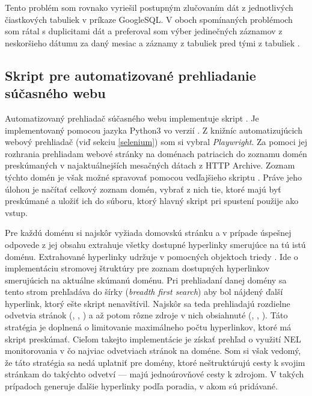 Tento problém som rovnako vyriešil postupným zlučovaním dát z jednotlivých čiastkových tabuliek v príkaze GoogleSQL.
V oboch spomínaných problémoch som rátal s duplicitami dát a preferoval som výber jedinečných záznamov z neskoršieho dátumu za daný mesiac a záznamy z tabuliek  pred tými z tabuliek .


\subsection{Skript pre automatizované prehliadanie súčasného webu}
\label{crawl_and_store}

Automatizovaný prehliadač súčasného webu implementuje skript .
Je implementovaný pomocou jazyka Python3 vo verzií . Z knižníc automatizujúcich webový 
prehliadač (viď sekciu \ref{selenium}) som si vybral \textit{Playwright}. 
Za pomoci jej rozhrania prehliadam webové stránky na doménach patriacich do zoznamu domén preskúmaných v najaktuálnejších mesačných dátach z HTTP Archive.
Zoznam týchto domén je však možné spravovať pomocou vedľajšieho skriptu .
Práve jeho úlohou je načítať celkový zoznam domén, vybrať z nich tie, ktoré majú byť preskúmané a uložiť ich do súboru, ktorý hlavný skript pri spustení použije ako vstup.

Pre každú doménu si najskôr vyžiada domovskú stránku a v prípade úspešnej odpovede z jej obsahu extrahuje všetky dostupné hyperlinky smerujúce na tú istú doménu.
Extrahované hyperlinky udržuje v pomocných objektoch triedy .
Ide o implementáciu stromovej štruktúry pre zoznam dostupných hyperlinkov smerujúcich na aktuálne skúmanú doménu. 
Pri prehliadaní danej domény sa tento strom prehľadáva do šírky (\textit{breadth first search}) aby bol nájdený ďalší hyperlink, ktorý ešte skript nenavštívil.
Najskôr sa teda prehliadajú rozdielne odvetvia stránok (, , ) a až potom rôzne zdroje v nich obsiahnuté (, , ).
Táto stratégia je doplnená o limitovanie maximálneho počtu hyperlinkov, ktoré má skript preskúmať.
Cieľom takejto implementácie je získať prehľad o využití NEL monitorovania v čo najviac odvetviach stránok na doméne.
Som si však vedomý, že táto stratégia sa nedá uplatniť pre domény, ktoré neštruktúrujú cesty k svojim stránkam do takýchto odvetví --- majú jednoúrovňové cesty k zdrojom.
V takých prípadoch generuje  ďalšie hyperlinky podľa poradia, v akom sú pridávané.

